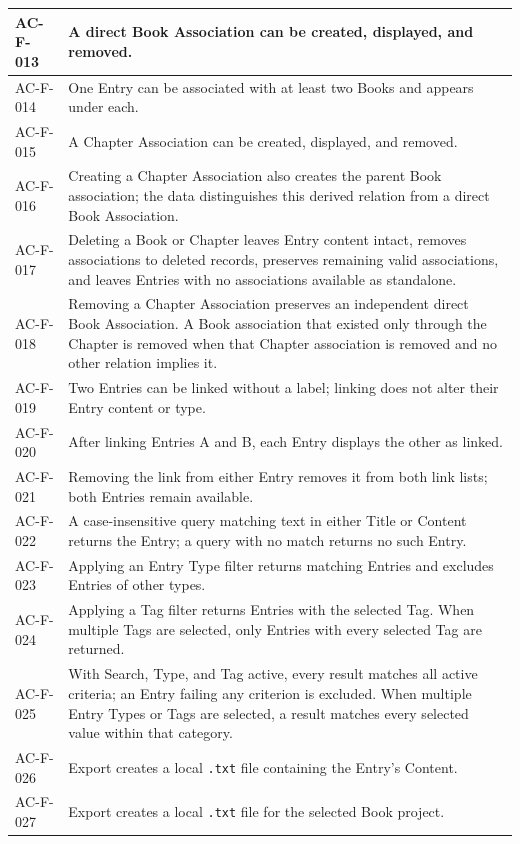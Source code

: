 \documentclass[11pt,a4paper]{article}
\begin{document}
\begin{longtable}{|L{2.4cm}|L{13.6cm}|}
AC-F-013 & A direct Book Association can be created, displayed, and removed. \\ \hline
AC-F-014 & One Entry can be associated with at least two Books and appears under each. \\ \hline
AC-F-015 & A Chapter Association can be created, displayed, and removed. \\ \hline
AC-F-016 & Creating a Chapter Association also creates the parent Book association; the data distinguishes this derived relation from a direct Book Association. \\ \hline
AC-F-017 & Deleting a Book or Chapter leaves Entry content intact, removes associations to deleted records, preserves remaining valid associations, and leaves Entries with no associations available as standalone. \\ \hline
AC-F-018 & Removing a Chapter Association preserves an independent direct Book Association. A Book association that existed only through the Chapter is removed when that Chapter association is removed and no other relation implies it. \\ \hline
AC-F-019 & Two Entries can be linked without a label; linking does not alter their Entry content or type. \\ \hline
AC-F-020 & After linking Entries A and B, each Entry displays the other as linked. \\ \hline
AC-F-021 & Removing the link from either Entry removes it from both link lists; both Entries remain available. \\ \hline
AC-F-022 & A case-insensitive query matching text in either Title or Content returns the Entry; a query with no match returns no such Entry. \\ \hline
AC-F-023 & Applying an Entry Type filter returns matching Entries and excludes Entries of other types. \\ \hline
AC-F-024 & Applying a Tag filter returns Entries with the selected Tag. When multiple Tags are selected, only Entries with every selected Tag are returned. \\ \hline
AC-F-025 & With Search, Type, and Tag active, every result matches all active criteria; an Entry failing any criterion is excluded. When multiple Entry Types or Tags are selected, a result matches every selected value within that category. \\ \hline
AC-F-026 & Export creates a local \texttt{.txt} file containing the Entry's Content. \\ \hline
AC-F-027 & Export creates a local \texttt{.txt} file for the selected Book project. \\ \hline

\end{longtable}
\end{document}
